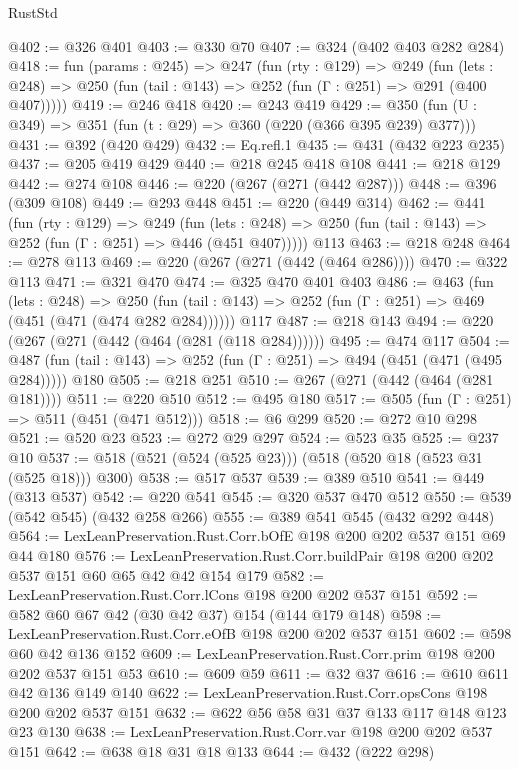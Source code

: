 \begin{lexlean}{RustStd}
\begin{coremodule}
{\begin{coremodule}
{{{{{@402 := @326 @401
@403 := @330 @70
@407 := @324 (@402 @403 @282 @284)
@418 := fun (params : @245) =>
  @247
    (fun (rty : @129) =>
    @249
      (fun (lets : @248) => @250 (fun (tail : @143) => @252 (fun (Γ : @251) => @291 (@400 @407)))))
@419 := @246 @418
@420 := @243 @419
@429 := @350 (fun (U : @349) => @351 (fun (t : @29) => @360 (@220 (@366 @395 @239) @377)))
@431 := @392 (@420 @429)
@432 := Eq.refl.{1}
@435 := @431 (@432 @223 @235)
@437 := @205 @419 @429
@440 := @218 @245 @418 @108
@441 := @218 @129
@442 := @274 @108
@446 := @220 (@267 (@271 (@442 @287)))
@448 := @396 (@309 @108)
@449 := @293 @448
@451 := @220 (@449 @314)
@462 := @441
    (fun (rty : @129) =>
    @249
      (fun (lets : @248) => @250 (fun (tail : @143) => @252 (fun (Γ : @251) => @446 (@451 @407)))))
    @113
@463 := @218 @248
@464 := @278 @113
@469 := @220 (@267 (@271 (@442 (@464 @286))))
@470 := @322 @113
@471 := @321 @470
@474 := @325 @470 @401 @403
@486 := @463
    (fun (lets : @248) =>
    @250 (fun (tail : @143) => @252 (fun (Γ : @251) => @469 (@451 (@471 (@474 @282 @284))))))
    @117
@487 := @218 @143
@494 := @220 (@267 (@271 (@442 (@464 (@281 (@118 @284))))))
@495 := @474 @117
@504 := @487 (fun (tail : @143) => @252 (fun (Γ : @251) => @494 (@451 (@471 (@495 @284))))) @180
@505 := @218 @251
@510 := @267 (@271 (@442 (@464 (@281 @181))))
@511 := @220 @510
@512 := @495 @180
@517 := @505 (fun (Γ : @251) => @511 (@451 (@471 @512)))
@518 := @6 @299
@520 := @272 @10 @298
@521 := @520 @23
@523 := @272 @29 @297
@524 := @523 @35
@525 := @237 @10
@537 := @518 (@521 (@524 (@525 @23))) (@518 (@520 @18 (@523 @31 (@525 @18))) @300)
@538 := @517 @537
@539 := @389 @510
@541 := @449 (@313 @537)
@542 := @220 @541
@545 := @320 @537 @470 @512
@550 := @539 (@542 @545) (@432 @258 @266)
@555 := @389 @541 @545 (@432 @292 @448)
@564 := LexLeanPreservation.Rust.Corr.bOfE @198 @200 @202 @537 @151 @69 @44 @180
@576 := LexLeanPreservation.Rust.Corr.buildPair @198 @200 @202 @537 @151 @60 @65 @42 @42 @154 @179
@582 := LexLeanPreservation.Rust.Corr.lCons @198 @200 @202 @537 @151
@592 := @582 @60 @67 @42 (@30 @42 @37) @154 (@144 @179 @148)
@598 := LexLeanPreservation.Rust.Corr.eOfB @198 @200 @202 @537 @151
@602 := @598 @60 @42 @136 @152
@609 := LexLeanPreservation.Rust.Corr.prim @198 @200 @202 @537 @151 @53
@610 := @609 @59
@611 := @32 @37
@616 := @610 @611 @42 @136 @149 @140
@622 := LexLeanPreservation.Rust.Corr.opsCons @198 @200 @202 @537 @151
@632 := @622 @56 @58 @31 @37 @133 @117 @148 @123 @23 @130
@638 := LexLeanPreservation.Rust.Corr.var @198 @200 @202 @537 @151
@642 := @638 @18 @31 @18 @133
@644 := @432 (@222 @298)
}}}}}
\end{coremodule}}
\end{coremodule}
\end{lexlean}
